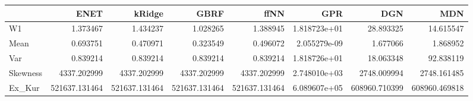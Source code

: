 \begin{tabular}{lrrrrrrr}
\toprule
{} &           ENET &         kRidge &           GBRF &           ffNN &           GPR &            DGN &            MDN \\
\midrule
W1       &       1.373467 &       1.434237 &       1.028265 &       1.388945 &  1.818723e+01 &      28.893325 &      14.615547 \\
Mean     &       0.693751 &       0.470971 &       0.323549 &       0.496072 &  2.055279e-09 &       1.677066 &       1.868952 \\
Var      &       0.839214 &       0.839214 &       0.839214 &       0.839214 &  1.818726e+01 &      18.063348 &      92.838119 \\
Skewness &    4337.202999 &    4337.202999 &    4337.202999 &    4337.202999 &  2.748010e+03 &    2748.009994 &    2748.161485 \\
Ex\_Kur   &  521637.131464 &  521637.131464 &  521637.131464 &  521637.131464 &  6.089607e+05 &  608960.710399 &  608960.469818 \\
\bottomrule
\end{tabular}
